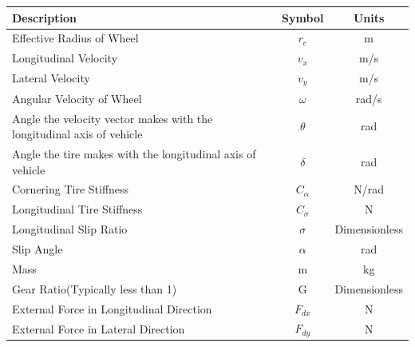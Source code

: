 \documentclass{article}
\begin{document}
\begin{center}
    \begin{tabular}{l c c}
        \toprule
        Description                                                           & Symbol     & Units                  \\
        \hline
        Effective Radius of Wheel                                             & $r_e$      & m                      \\
        Longitudinal Velocity                                                 & $v_x$      & m/s                    \\
        Lateral Velocity                                                      & $v_y$      & m/s                    \\
        Angular Velocity of Wheel                                             & $\omega$   & rad/s                  \\
        Angle the velocity vector makes with the longitudinal axis of vehicle & $\theta$   & rad                    \\
        Angle the tire makes with the longitudinal axis of vehicle            & $\delta$   & rad                    \\
        Cornering Tire Stiffness                                              & $C_\alpha$ & N/rad                  \\
        Longitudinal Tire Stiffness                                           & $C_\sigma$ & N                      \\
        Longitudinal Slip Ratio                                               & $\sigma$   & Dimensionless          \\
        Slip Angle                                                            & $\alpha$   & rad                    \\
        Mass                                                                  & m          & kg                     \\
        Gear Ratio(Typically less than 1)                                     & G          & Dimensionless          \\
        External Force in Longitudinal Direction                              & $F_{dx}$   & N                      \\
        External Force in Lateral Direction                                   & $F_{dy}$   & N                      \\

\end{tabular}
\end{center}
\end{document}
